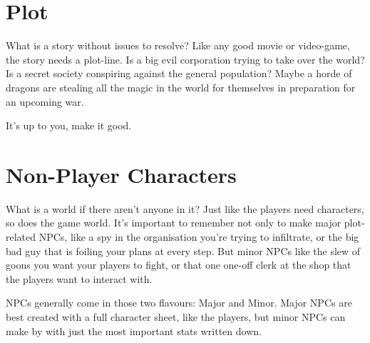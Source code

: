 \section{Plot}
What is a story without issues to resolve? Like any good movie or video-game, the story needs a plot-line.
Is a big evil corporation trying to take over the world?
Is a secret society conspiring against the general population?
Maybe a horde of dragons are stealing all the magic in the world for themselves in preparation for an upcoming war.

It's up to you, make it good.

\section{Non-Player Characters}
What is a world if there aren't anyone in it?
Just like the players need characters, so does the game world.
It's important to remember not only to make major plot-related NPCs, like a spy in the organisation you're trying to infiltrate, or the big bad guy that is foiling your plans at every step.
But minor NPCs like the slew of goons you want your players to fight, or that one one-off clerk at the shop that the players want to interact with.

NPCs generally come in those two flavours: Major and Minor.
Major NPCs are best created with a full character sheet, like the players, but minor NPCs can make by with just the most important stats written down.